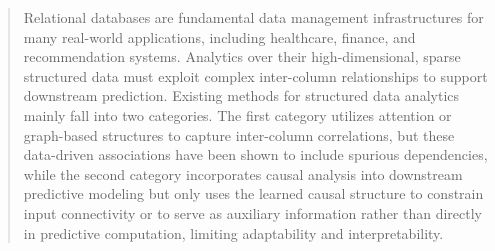 \documentclass[conference]{IEEEtran}
\newcommand{\vldb}[1]{{\color{black}#1}}
\newcommand{\syic}[1]{{\color{black}#1}}
\begin{document}
\begin{abstract}
Relational databases are fundamental data management infrastructures for many real-world applications, including healthcare, finance, and recommendation systems. \syic{Analytics over their high-dimensional, sparse structured data must exploit complex inter-column relationships to support downstream prediction.}
Existing methods for structured data analytics mainly fall into two categories. 
The first \syic{category} utilizes \syic{attention or graph-based structures to capture} inter-column correlations, but these data-driven associations have been shown to include \vldb{spurious dependencies}, 
\syic{while the second \syic{category} incorporates causal analysis into downstream predictive modeling but only uses the learned causal structure to constrain input connectivity or to serve as auxiliary information rather than directly in predictive computation, limiting adaptability and interpretability.}


\end{abstract}
\end{document}
